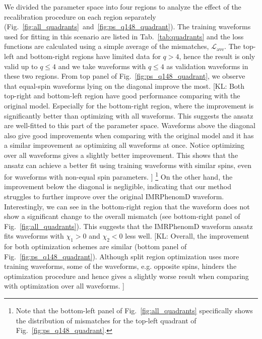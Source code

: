 \documentclass[twocolumn]{aastex631}
\newcommand{\kl}[1]{{\color{cyan}[KL: #1 ]}}
\begin{document}
We divided the parameter space into four regions to analyze the effect of the
recalibration procedure on each region separately
(Fig.~\ref{fig:all_quadrants}~and~\ref{fig:ps_q148_quadrant}). The training waveforms used for fitting in
this scenario are listed in Tab.~\ref{tab:quadrants} and the loss functions 
are calculated using a simple average of the mismatches, $\mathcal{L}_{\mathrm{ave}}$. The top-left and
bottom-right regions have limited data for $q>4$, hence the result is only valid up to $q\leq4$ and we take waveforms with $q\leq4$ as validation waveforms in these two regions. From top panel of Fig.~\ref{fig:ps_q148_quadrant}, we observe that
equal-spin waveforms lying on the diagonal improve the most. 
\kl{Both top-right and bottom-left region have good performance comparing with the original model. Especially for the bottom-right region, where the improvement is significantly better than optimizing with all waveforms. This suggests the ansatz are well-fitted to this part of the parameter space.
Waveforms above the diagonal also give good improvements when comparing with the original model and it has a similar improvement as optimizing all waveforms at once. Notice optimizing over all waveforms gives a slightly better improvement. This shows that the ansatz can achieve a better fit using training waveforms with similar spins, even for waveforms with non-equal spin parameters.}
\footnote{
	Note that the bottom-left panel of Fig.~\ref{fig:all_quadrants} specifically shows the
	distribution of mismatches for the top-left quadrant of Fig.~\ref{fig:ps_q148_quadrant}.
} 
On the other hand, the improvement below the diagonal is negligible, indicating that our method struggles to
further improve over the original IMRPhenomD waveform. 
Interestingly, we can see in the bottom-right region that the waveform does not show a significant change
to the overall mismatch (see bottom-right panel of Fig.~\ref{fig:all_quadrants}). 
This suggests that the IMRPhenomD waveform ansatz fits waveforms with
$\chi_1>0$ and $\chi_2<0$ less well. 
\kl{Overall, the improvement for both optimization schemes are similar (bottom panel of Fig.~\ref{fig:ps_q148_quadrant}). Although split region optimization uses more training waveforms, some of the waveforms, e.g. opposite spins, hinders the optimization procedure and hence gives a slightly worse result when comparing with optimization over all waveforms.}
\end{document}
